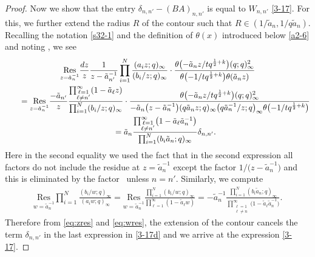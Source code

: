 \documentclass[11pt]{article}
\numberwithin{equation}{section}
\numberwithin{equation}{section}
\def\i{\infty}
\begin{document}
\begin{proof}
 Now we show that the entry $\delta_{n,n'}-(BA)_{n,n'}$ is equal to $W_{n,n'}$ \eqref{3-17}. For this, we further extend the radius $R$ of the contour such that $R\in(1/\tilde{a}_n,1/q\tilde{a}_n)$. Recalling the notation \eqref{s32-1} and the definition of $\theta (x)$ introduced below \eqref{a2-6} and
 noting ,
 we see
 \begin{gather}
 \underset{z=\tilde{a}_{n}^{-1}}{\text{Res}}
 \frac{{\rm d}z}{z}
 \frac{1}{z-\tilde{a}_{n'}^{-1}}
 \prod_{i=1}^N\frac{(a_i z;q)_{\i}}{(b_i/z;q)_{\i}}
 \cdot
 \frac{\theta\bigl(-\tilde{a}_{n}z/tq^{\frac12+k}\bigr)(q;q)_{\i}^2}{\theta\bigl(-1/tq^{\frac12+k}\bigr)\theta(\tilde{a}_n z)}\nonumber \\
 \qquad=\underset{z=\tilde{a}_{n}^{-1}}{\text{Res}}
 \frac{-\tilde{a}_{n'}}{z}
 \frac{\prod_{\substack{\ell=1\\ \ell\neq n'}}^{\infty}(1-\tilde{a}_\ell z)}{\prod_{i=1}^N(b_i/z;q)_{\i}}
 \cdot
 \frac{\theta\bigl(-\tilde{a}_{n}z/tq^{\frac12+k}\bigr)(q;q)_{\i}^2}{-\tilde{a}_n\bigl(z-\tilde{a}_n^{-1}\bigr)(q\tilde{a}_nz;q)_\infty \bigl(q\tilde{a}_n^{-1}/z;q\bigr)_\infty\theta\bigl(-1/tq^{\frac12+k}\bigr)}
 \nonumber\\
 \qquad = \tilde{a}_n
 \frac{\prod_{\substack{\ell=1\\ \ell\neq n'}}^{\infty}\bigl(1-\tilde{a}_\ell \tilde{a}_n^{-1}\bigr)}{\prod_{i=1}^N(b_i \tilde{a}_n;q)_{\i}}\delta_{n,n'}. \label{eq:zres}
 \end{gather}
 Here in the second equality we used the fact that in the second expression all factors do not include the residue at $z=\tilde{a}_n^{-1}$ except the factor $1/\big(z-\tilde{a}_n^{-1}\big)$ and this is eliminated by the factor~ unless $n=n'$.
 Similarly, we compute
 \begin{align}\label{eq:wres}
 \underset{w=\tilde{a}_{n}^{-1}}{\text{Res}}
 \prod_{i=1}^N\frac{(b_i/w;q)_{\i}}{(a_i w;q)_{\i}}=\underset{w=\tilde{a}_{n}^{-1}}{\text{Res}}\frac{\prod_{i=1}^N(b_i/w;q)_{\i}}{\prod_{\ell=1}^{\infty}(1-\tilde{a}_{\ell}w)}=-\tilde{a}_n^{-1}
 \frac{\prod_{i=1}^N(b_i \tilde{a}_n;q)_{\i}}{\prod_{\substack{\ell=1\\ \ell\neq n}}^{\infty}\big(1-\tilde{a}_\ell \tilde{a}_n^{-1}\big)}.
 \end{align}
 Therefore from \eqref{eq:zres} and \eqref{eq:wres}, the extension of the contour cancels the term $\delta_{n,n'}$ in the last expression in \eqref{3-17d} and we arrive at the expression \eqref{3-17}.
 \end{proof}
\end{document}
